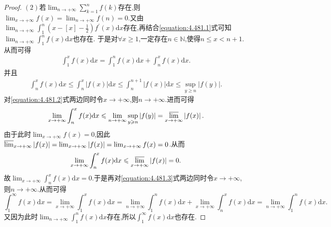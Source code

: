 \documentclass[../../main.tex]{subfiles}%
\begin{document}
\begin{proof}
\((2)\)若\(\lim_{n\rightarrow +\infty}\sum\limits_{k = 1}^n f(k)\)存在,则\(\lim_{x\rightarrow +\infty}f(x)=\lim_{n\rightarrow +\infty}f(n)=0\).又由\(\lim_{n\rightarrow +\infty}\int_1^n\left(x - [x] - \frac{1}{2}\right)f^\prime(x)\mathrm{d}x\)存在,再结合\eqref{equation:4.481.1}式可知\(\lim_{n\rightarrow +\infty}\int_1^n f(x)\mathrm{d}x\)也存在.
于是对\(\forall x\geqslant1\),一定存在\(n\in\mathbb{N}\),使得\(n\leqslant x < n + 1\).从而可得
\begin{align}\label{equation:4.481.3}
\int_1^x f(x)\mathrm{d}x=\int_1^n f(x)\mathrm{d}x+\int_n^x f(x)\mathrm{d}x. 
\end{align}
并且
\begin{align}\label{equation:4.481.2}
\int_n^x f(x)\mathrm{d}x\leqslant\int_n^x\left|f(x)\right|\mathrm{d}x\leqslant\int_n^{n + 1}\left|f(x)\right|\mathrm{d}x\leqslant\sup_{y\geqslant n}\left|f(y)\right|.
\end{align}
对\eqref{equation:4.481.2}式两边同时令\(x\rightarrow +\infty\),则\(n\rightarrow +\infty\).进而可得
\[
\lim_{x\rightarrow +\infty}\int_n^x f(x)\mathrm{d}x\leqslant\lim_{n\rightarrow +\infty}\sup_{y\geqslant n}\left|f(y)\right|={\varlimsup_{x\rightarrow +\infty}}\left|f(x)\right|.
\]
由于此时\(\lim_{x\rightarrow +\infty}f(x)=0\),因此\({\varlimsup_{x\rightarrow +\infty}}\left|f(x)\right|=\lim_{x\rightarrow +\infty}\left|f(x)\right|=\lim_{x\rightarrow +\infty}f(x)=0\).从而
\[
\lim_{x\rightarrow +\infty}\int_n^x f(x)\mathrm{d}x\leqslant{\varlimsup_{x\rightarrow +\infty}}\left|f(x)\right|=0.
\]
故\(\lim_{x\rightarrow +\infty}\int_n^x f(x)\mathrm{d}x = 0\).于是再对\eqref{equation:4.481.3}式两边同时令\(x\rightarrow +\infty\),则\(n\rightarrow +\infty\).从而可得
\[
\int_1^{\infty}f(x)\mathrm{d}x=\lim_{x\rightarrow +\infty}\int_1^x f(x)\mathrm{d}x=\lim_{n\rightarrow +\infty}\int_1^n f(x)\mathrm{d}x+\lim_{x\rightarrow +\infty}\int_n^x f(x)\mathrm{d}x=\lim_{n\rightarrow +\infty}\int_1^n f(x)\mathrm{d}x.
\]
又因为此时\(\lim_{n\rightarrow +\infty}\int_1^n f(x)\mathrm{d}x\)存在,所以\(\int_1^{\infty}f(x)\mathrm{d}x\)也存在.
\end{proof}
\end{document}
